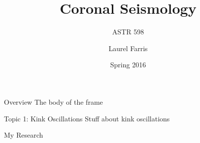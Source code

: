 \documentclass{beamer}
\title{Coronal Seismology}
\subtitle{ASTR 598}
\date{Spring 2016}
\author{Laurel Farris}
\begin{document}
\begin{frame}
    \titlepage
\end{frame}

\begin{frame}{Overview}
    The body of the frame
\end{frame}

\begin{frame}{Topic 1: Kink Oscillations}
    Stuff about kink oscillations
\end{frame}

\begin{frame}{My Research}
\end{frame}
\end{document}
